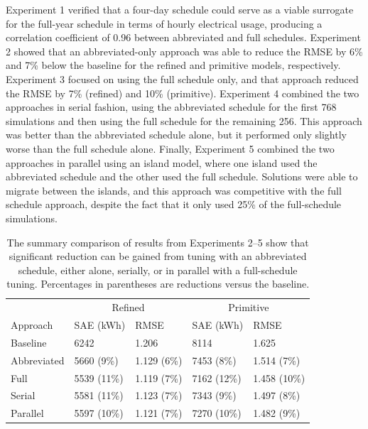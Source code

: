 \documentclass[preprint, review, 12pt]{elsarticle}
\begin{document}
Experiment 1 verified that a four-day schedule could serve as a viable surrogate for the full-year schedule in terms of hourly electrical usage, producing a correlation coefficient of 0.96 between abbreviated and full schedules. Experiment 2 showed that an abbreviated-only approach was able to reduce the RMSE by 6\% and 7\% below the baseline for the refined and primitive models, respectively. Experiment 3 focused on using the full schedule only, and that approach reduced the RMSE by 7\% (refined) and 10\% (primitive). Experiment 4 combined the two approaches in serial fashion, using the abbreviated schedule for the first 768 simulations and then using the full schedule for the remaining 256. This approach was better than the abbreviated schedule alone, but it performed only slightly worse than the full schedule alone. Finally, Experiment 5 combined the two approaches in parallel using an island model, where one island used the abbreviated schedule and the other used the full schedule. Solutions were able to migrate between the islands, and this approach was competitive with the full schedule approach, despite the fact that it only used 25\% of the full-schedule simulations.


\begin{table}[htbp]
\centering
\caption{The summary comparison of results from Experiments 2--5 show that significant reduction can be gained from tuning with an abbreviated schedule, either alone, serially, or in parallel with a full-schedule tuning. Percentages in parentheses are reductions versus the baseline.}
\label{tab:hourly-summary}
\begin{tabular}{lllll}
\toprule
 &  \multicolumn{2}{c}{Refined} & \multicolumn{2}{c}{Primitive}\\
Approach & SAE (kWh) & RMSE & SAE (kWh) & RMSE \\
\midrule
Baseline    & 6242        & 1.206       & 8114        & 1.625 \\\rowcolor{DarkRow}
Abbreviated & 5660 (9\%)  & 1.129 (6\%) & 7453 (8\%)  & 1.514 (7\%)\\
Full        & 5539 (11\%) & 1.119 (7\%) & 7162 (12\%) & 1.458 (10\%)\\\rowcolor{DarkRow}
Serial      & 5581 (11\%) & 1.123 (7\%) & 7343 (9\%)  & 1.497 (8\%)\\
Parallel    & 5597 (10\%) & 1.121 (7\%) & 7270 (10\%) & 1.482 (9\%)\\
\bottomrule
\end{tabular}
\end{table}
\end{document}
